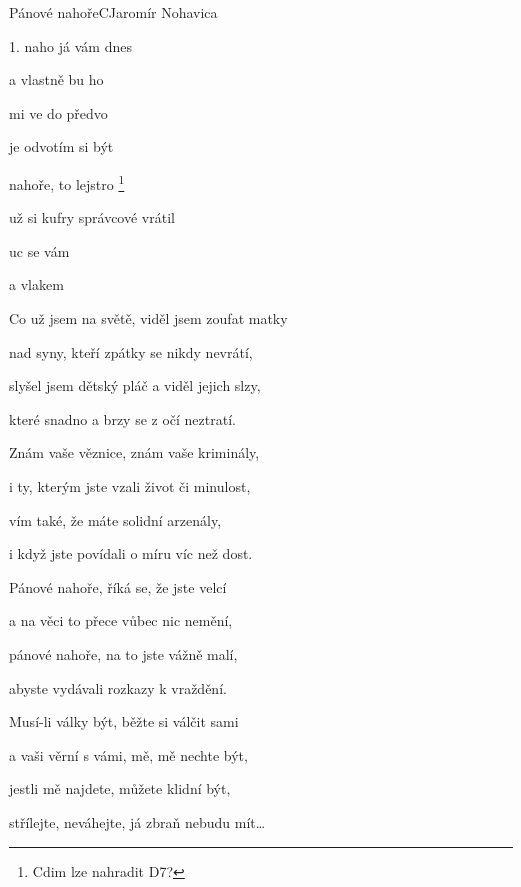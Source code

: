 \setcounter{page}{64}
\begin{song}{Pánové nahoře}{C}{Jaromír Nohavica}

\begin{SBVerse}

1.  naho já  vám dnes 

a  vlastně  bu ho 

 mi ve  do  předvo

je  odvotím  si  být 

 nahoře, to lejstro \footnote{Cdim lze nahradit D7?}

už  si kufry  správcové vrátil 

  uc se vám 

a  vlakem      
\end{SBVerse}

\begin{SBVerse}
Co už jsem na světě, viděl jsem zoufat matky

nad syny, kteří zpátky se nikdy nevrátí,

slyšel jsem dětský pláč a viděl jejich slzy,

které snadno a brzy se z očí neztratí.

Znám vaše věznice, znám vaše kriminály,

i ty, kterým jste vzali život či minulost,

vím také, že máte solidní arzenály,

i když jste povídali o míru víc než dost.
\end{SBVerse}

\begin{SBVerse}
Pánové nahoře, říká se, že jste velcí

a na věci to přece vůbec nic nemění,

pánové nahoře, na to jste vážně malí,

abyste vydávali rozkazy k vraždění.

Musí-li války být, běžte si válčit sami

a vaši věrní s vámi, mě, mě nechte být,

jestli mě najdete, můžete klidní být,

střílejte, neváhejte, já zbraň nebudu mít\dots
\end{SBVerse}

\end{song}

\pagebreak
